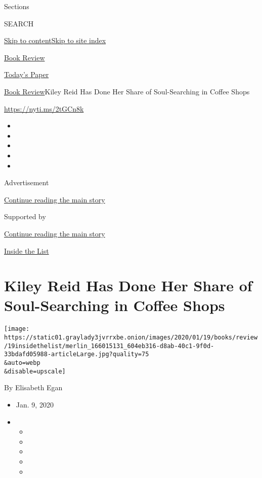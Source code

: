 Sections

SEARCH

\protect\hyperlink{site-content}{Skip to
content}\protect\hyperlink{site-index}{Skip to site index}

\href{https://www.nytimes3xbfgragh.onion/section/books/review}{Book
Review}

\href{https://myaccount.nytimes3xbfgragh.onion/auth/login?response_type=cookie\&client_id=vi}{}

\href{https://www.nytimes3xbfgragh.onion/section/todayspaper}{Today's
Paper}

\href{/section/books/review}{Book Review}\textbar{}Kiley Reid Has Done
Her Share of Soul-Searching in Coffee Shops

\url{https://nyti.ms/2tGCn8k}

\begin{itemize}
\item
\item
\item
\item
\item
\end{itemize}

Advertisement

\protect\hyperlink{after-top}{Continue reading the main story}

Supported by

\protect\hyperlink{after-sponsor}{Continue reading the main story}

\href{/column/inside-the-list}{Inside the List}

\hypertarget{kiley-reid-has-done-her-share-of-soul-searching-in-coffee-shops}{%
\section{Kiley Reid Has Done Her Share of Soul-Searching in Coffee
Shops}\label{kiley-reid-has-done-her-share-of-soul-searching-in-coffee-shops}}

\texttt{[image: https://static01.graylady3jvrrxbe.onion/images/2020/01/19/books/review/19insidethelist/merlin\_166015131\_604eb316-d8ab-40c1-9f0d-33bdafd05988-articleLarge.jpg?quality=75\\\&auto=webp\\\&disable=upscale]}

By Elisabeth Egan

\begin{itemize}
\item
  Jan. 9, 2020
\item
  \begin{itemize}
  \item
  \item
  \item
  \item
  \item
  \end{itemize}
\end{itemize}

